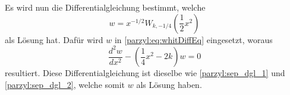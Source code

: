 %
Es wird nun die Differentialgleichung bestimmt, welche
\begin{equation}
    w = x^{-1/2} W_{k,-1/4} \left({\textstyle \frac{1}{2}} x^2\right)
\end{equation}
als Lösung hat.
Dafür wird $w$ in \eqref{parzyl:eq:whitDiffEq} eingesetzt, woraus
\begin{equation}
    \frac{d^2 w}{dx^2} - \left(\frac{1}{4} x^2 - 2k\right) w = 0
\label{parzyl:eq:weberDiffEq}
\end{equation}
resultiert. Diese Differentialgleichung ist dieselbe wie 
\eqref{parzyl:sep_dgl_1} und \eqref{parzyl:sep_dgl_2}, welche somit
$w$ als Lösung haben.
